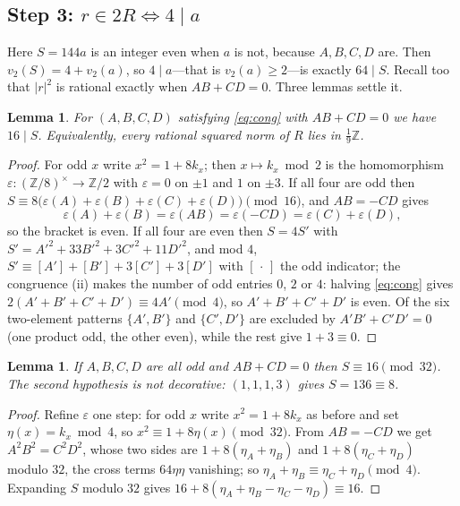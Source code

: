 \documentclass[11pt,reqno]{amsart}
\theoremstyle{plain}
\newtheorem{lemma}[theorem]{Lemma}
\theoremstyle{definition}
\newcommand{\Z}{\mathbb{Z}}
\newcommand{\Lat}{R}
\begin{document}
\subsection*{Step 3: $r \in 2\Lat \iff 4 \mid a$}
Here $S = 144a$ is an integer even when $a$ is not, because $A,B,C,D$ are.
Then $v_2(S) = 4 + v_2(a)$, so $4 \mid a$---that is
$v_2(a) \ge 2$---is exactly $64 \mid S$. Recall too that $\lvert r \rvert^2$ is
rational exactly when $AB + CD = 0$. Three lemmas settle it.

\begin{lemma}\label{lem:A}
For $(A,B,C,D)$ satisfying \eqref{eq:cong} with $AB + CD = 0$ we have
$16 \mid S$. Equivalently, every rational squared norm of $\Lat$ lies in
$\tfrac19\Z$.
\end{lemma}

\begin{proof}
For odd $x$ write $x^2 = 1 + 8k_x$; then $x \mapsto k_x \bmod 2$ is the
homomorphism $\varepsilon : (\Z/8)^\times \to \Z/2$ with $\varepsilon = 0$ on
$\pm1$ and $1$ on $\pm3$. If all four are odd then
$S \equiv 8\big(\varepsilon(A)+\varepsilon(B)+\varepsilon(C)+\varepsilon(D)\big)
\pmod{16}$, and $AB = -CD$ gives
\[
  \varepsilon(A)+\varepsilon(B) = \varepsilon(AB) = \varepsilon(-CD)
  = \varepsilon(C)+\varepsilon(D),
\]
so the bracket is even. If all four are even then $S = 4S'$ with
$S' = A'^2 + 33B'^2 + 3C'^2 + 11D'^2$, and mod $4$,
$S' \equiv [A'] + [B'] + 3[C'] + 3[D']$ with $[\,\cdot\,]$ the odd indicator; the
congruence (ii) makes the number of odd entries $0$, $2$ or $4$: halving
\eqref{eq:cong} gives $2(A'+B'+C'+D') \equiv 4A' \pmod 4$, so
$A'+B'+C'+D'$ is even. Of the six
two-element patterns $\{A',B'\}$ and $\{C',D'\}$ are excluded by
$A'B' + C'D' = 0$ (one product odd, the other even), while the rest give
$1 + 3 \equiv 0$.
\end{proof}

\begin{lemma}\label{lem:B}
If $A,B,C,D$ are all odd and $AB + CD = 0$ then $S \equiv 16 \pmod{32}$. The
second hypothesis is not decorative: $(1,1,1,3)$ gives $S = 136 \equiv 8$.
\end{lemma}

\begin{proof}
Refine $\varepsilon$ one step: for odd $x$ write $x^2 = 1 + 8k_x$ as before and
set $\eta(x) = k_x \bmod 4$, so $x^2 \equiv 1 + 8\eta(x) \pmod{32}$. From
$AB = -CD$ we get $A^2B^2 = C^2D^2$, whose two sides are $1 + 8(\eta_A+\eta_B)$
and $1 + 8(\eta_C+\eta_D)$ modulo $32$, the cross terms $64\eta\eta$ vanishing;
so $\eta_A + \eta_B \equiv \eta_C + \eta_D \pmod 4$. Expanding $S$ modulo $32$
gives $16 + 8(\eta_A + \eta_B - \eta_C - \eta_D) \equiv 16$.
\end{proof}
\end{document}
